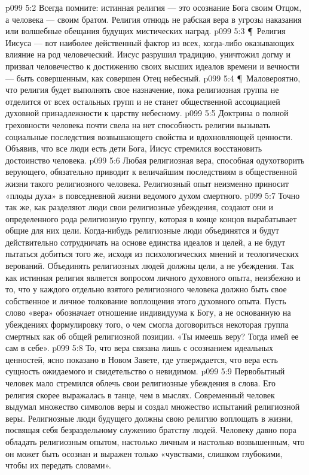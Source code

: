 \vs p099 5:2 Всегда помните: истинная религия --- это осознание Бога своим Отцом, а человека --- своим братом. Религия отнюдь не рабская вера в угрозы наказания или волшебные обещания будущих мистических наград.
\vs p099 5:3 \P\ Религия Иисуса --- вот наиболее действенный фактор из всех, когда\hyp{}либо оказывающих влияние на род человеческий. Иисус разрушил традицию, уничтожил догму и призвал человечество к достижению своих высших идеалов времени и вечности --- быть совершенным, как совершен Отец небесный.
\vs p099 5:4 \P\ Маловероятно, что религия будет выполнять свое назначение, пока религиозная группа не отделится от всех остальных групп и не станет общественной ассоциацией духовной принадлежности к царству небесному.
\vs p099 5:5 Доктрина о полной греховности человека почти свела на нет способность религии вызывать социальные последствия возвышающего свойства и вдохновляющей ценности. Объявив, что все люди есть дети Бога, Иисус стремился восстановить достоинство человека.
\vs p099 5:6 Любая религиозная вера, способная одухотворить верующего, обязательно приводит к величайшим последствиям в общественной жизни такого религиозного человека. Религиозный опыт неизменно приносит «плоды духа» в повседневной жизни ведомого духом смертного.
\vs p099 5:7 Точно так же, как разделяют люди свои религиозные убеждения, создают они и определенного рода религиозную группу, которая в конце концов вырабатывает общие для них цели. Когда\hyp{}нибудь религиозные люди объединятся и будут действительно сотрудничать на основе единства идеалов и целей, а не будут пытаться добиться того же, исходя из психологических мнений и теологических верований. Объединять религиозных людей должны цели, а не убеждения. Так как истинная религия является вопросом личного духовного опыта, неизбежно и то, что у каждого отдельно взятого религиозного человека должно быть свое собственное и личное толкование воплощения этого духовного опыта. Пусть слово «вера» обозначает отношение индивидуума к Богу, а не основанную на убеждениях формулировку того, о чем смогла договориться некоторая группа смертных как об общей религиозной позиции. «Ты имеешь веру? Тогда имей ее сам в себе».
\vs p099 5:8 То, что вера связана лишь с осознанием идеальных ценностей, ясно показано в Новом Завете, где утверждается, что вера есть сущность ожидаемого и свидетельство о невидимом.
\vs p099 5:9 Первобытный человек мало стремился облечь свои религиозные убеждения в слова. Его религия скорее выражалась в танце, чем в мыслях. Современный человек выдумал множество символов веры и создал множество испытаний религиозной веры. Религиозные люди будущего должны свою религию воплощать в жизни, посвящая себя безраздельному служению братству людей. Человеку давно пора обладать религиозным опытом, настолько личным и настолько возвышенным, что он может быть осознан и выражен только «чувствами, слишком глубокими, чтобы их передать словами».
